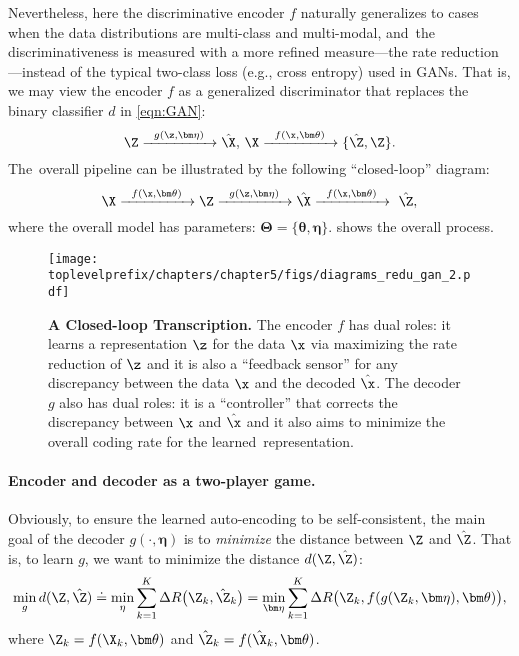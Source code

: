 \documentclass[../../book-main.tex]{subfiles}
\begin{document}
{Nevertheless, here the  discriminative encoder $f$ naturally generalizes to cases when the data distributions are multi-class and multi-modal, and~the discriminativeness is measured with a more refined measure---the rate reduction---instead of the typical two-class loss (e.g., cross entropy) used in GANs. That is, we may view the encoder $f$ as a generalized discriminator that replaces the binary classifier $d$ in \eqref{eqn:GAN}:
\begin{equation}
 \Z \xrightarrow{\hspace{2mm} g(\z,\bm \eta) \hspace{2mm}} \hat \X, \, \X \xrightarrow{\hspace{2mm} f(\x, \bm \theta)\hspace{2mm}} \{\hat \Z, \Z\}.
 \label{eqn:closed-loop-GAN}
\end{equation}
The~overall pipeline can be illustrated by the following ``closed-loop''  diagram:}
\begin{equation}
    \X \xrightarrow{\hspace{2mm} f(\x, \bm \theta)\hspace{2mm}} \Z \xrightarrow{\hspace{2mm} g(\z,\bm \eta) \hspace{2mm}} \hat \X \xrightarrow{\hspace{2mm} f(\x, \bm \theta)\hspace{2mm}} \ \hat \Z, 
\end{equation}
where the overall model has parameters: $\bm \Theta = \{\bm \theta, \bm \eta\}$.  shows the overall process.  

\begin{figure}[t]
{\texttt{[image: \\toplevelprefix/chapters/chapter5/figs/diagrams\_redu\_gan\_2.pdf]}}
\caption{{\bf %
 A Closed-loop Transcription.} The encoder $f$ has dual roles: it learns a representation $\z$ for the data $\x$ via maximizing the rate reduction of $\z$ and it is also a ``feedback sensor'' for any discrepancy between the data $\x$ and the decoded $\hat \x$. The decoder $g$ also has dual roles: it is a ``controller'' that corrects the  discrepancy between $\x$ and $\hat \x$ and it also aims to minimize the overall coding rate for the learned~representation.} \label{fig:auto-encoding-closed} 
\end{figure}


\paragraph{Encoder and decoder as a two-player game.}
Obviously, to ensure the learned auto-encoding to be self-consistent,  the main goal of the decoder $g(\cdot, \bm \eta)$ is to {\em minimize} the distance between $\Z$ and $\hat \Z$. That is, to learn $g$, we want to minimize the distance $d(\Z, \hat \Z)$:
\begin{equation}
\min_g d(\Z, \hat \Z) \doteq \min_\eta  \sum_{k=1}^K \Delta R\big(\Z_k, \hat{\Z}_k\big) =  \min_{\bm \eta}  \sum_{k=1}^K \Delta R\big(\Z_k, f(g(\Z_k, \bm \eta),\bm \theta)\big),
\label{eqn:min-distance}
\end{equation}
where $\Z_k = f(\X_k,\bm \theta)$ and $\hat \Z_k = f(\hat{\X}_k,\bm\theta)$. 
\end{document}

